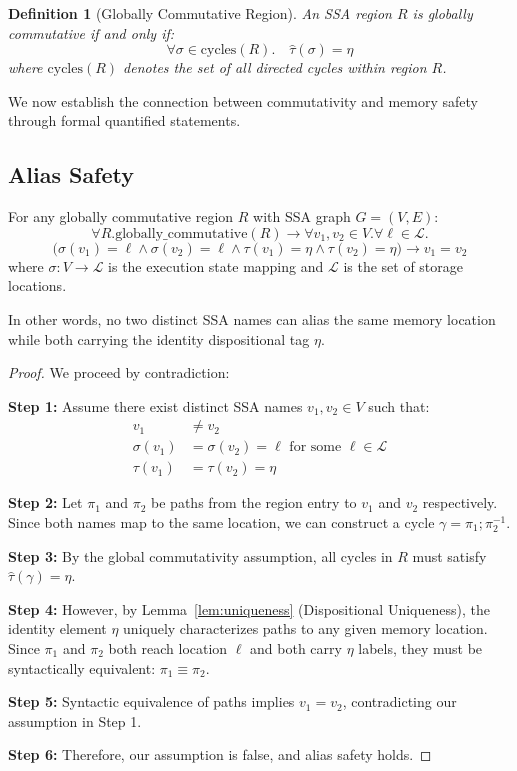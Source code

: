 \documentclass[journal]{IEEEtran}
\newtheorem{definition}{Definition}
\begin{document}
\begin{definition}[Globally Commutative Region]
An SSA region $R$ is globally commutative if and only if:
$$\forall \sigma \in \text{cycles}(R). \quad \hat{\tau}(\sigma) = \eta$$
where $\text{cycles}(R)$ denotes the set of all directed cycles within region $R$.
\end{definition}

We now establish the connection between commutativity and memory safety through formal quantified statements.

\subsection{Alias Safety}

\begin{theorem}
For any globally commutative region $R$ with SSA graph $G = (V, E)$:
$$\forall R. \text{globally\_commutative}(R) \rightarrow \forall v_1, v_2 \in V. \forall \ell \in \mathcal{L}. $$
$$\big( \sigma(v_1) = \ell \land \sigma(v_2) = \ell \land \tau(v_1) = \eta \land \tau(v_2) = \eta \big) \rightarrow v_1 = v_2$$
where $\sigma: V \to \mathcal{L}$ is the execution state mapping and $\mathcal{L}$ is the set of storage locations.

In other words, no two distinct SSA names can alias the same memory location while both carrying the identity dispositional tag $\eta$.
\end{theorem}

\begin{proof}
We proceed by contradiction:

\textbf{Step 1:} Assume there exist distinct SSA names $v_1, v_2 \in V$ such that:
\begin{align}
v_1 &\neq v_2 \\
\sigma(v_1) &= \sigma(v_2) = \ell \text{ for some } \ell \in \mathcal{L} \\
\tau(v_1) &= \tau(v_2) = \eta
\end{align}

\textbf{Step 2:} Let $\pi_1$ and $\pi_2$ be paths from the region entry to $v_1$ and $v_2$ respectively. Since both names map to the same location, we can construct a cycle $\gamma = \pi_1 ; \pi_2^{-1}$.

\textbf{Step 3:} By the global commutativity assumption, all cycles in $R$ must satisfy $\hat{\tau}(\gamma) = \eta$.

\textbf{Step 4:} However, by Lemma~\ref{lem:uniqueness} (Dispositional Uniqueness), the identity element $\eta$ uniquely characterizes paths to any given memory location. Since $\pi_1$ and $\pi_2$ both reach location $\ell$ and both carry $\eta$ labels, they must be syntactically equivalent: $\pi_1 \equiv \pi_2$.

\textbf{Step 5:} Syntactic equivalence of paths implies $v_1 = v_2$, contradicting our assumption in Step 1.

\textbf{Step 6:} Therefore, our assumption is false, and alias safety holds. 
\end{proof}
\end{document}
